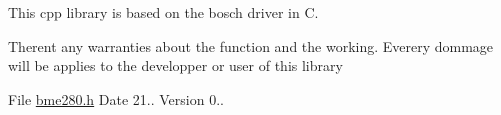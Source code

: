 This cpp library is based on the bosch driver in C.

Theren\textquotesingle{}t any warranties about the function and the working. Everery dommage will be applies to the developper or user of this library

File \mbox{\hyperlink{bme280_8h_source}{bme280.\+h}} Date 21.. Version 0.. 